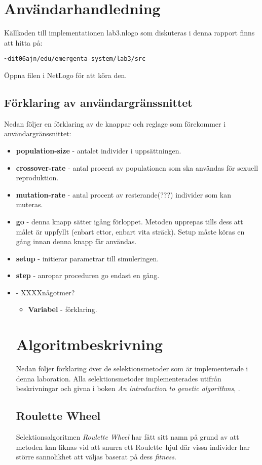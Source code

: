 \documentclass[titlepage, a4paper, 12pt]{article}
\begin{document}
\section{Användarhandledning}
Källkoden till implementationen lab3.nlogo som diskuteras i denna
rapport finns att hitta på:

\verb!~dit06ajn/edu/emergenta-system/lab3/src!

Öppna filen i NetLogo för att köra den.

\subsection{Förklaring av användargränssnittet}
Nedan följer en förklaring av de knappar och reglage som förekommer i
användargränssnittet:

\begin{itemize}
\item \textbf{population-size} - antalet individer i uppsättningen.
\item \textbf{crossover-rate} - antal procent av populationen som ska användas för sexuell reproduktion.
\item \textbf{mutation-rate} - antal procent av resterande(???) individer som kan muteras.
\item \textbf{go} - denna knapp sätter igång förloppet. Metoden upprepas tills dess att målet är uppfyllt (enbart ettor, enbart vita sträck). Setup måste köras en gång innan denna knapp får användas.
\item \textbf{setup} - initierar parametrar till simuleringen.
\item \textbf{step} - anropar proceduren go endast en gång.
\item \textbf{} - XXXXnågotmer?

\begin{itemize}
\item \textbf{Variabel} - förklaring.
\end{itemize}

\section{Algoritmbeskrivning}
Nedan följer förklaring över de selektionsmetoder som är
implementerade i denna laboration. Alla selektionsmetoder
implementerades utifrån beskrivningar och givna i boken \textit{An
  introduction to genetic algorithms}, \cite{gen-intro}.

\subsection{Roulette Wheel}\label{sec:roulette-wheel}
Selektionsalgoritmen \textit{Roulette Wheel} har fått sitt namn på
grund av att metoden kan liknas vid att snurra ett Roulette–hjul där
vissa individer har större sannolikhet att väljas baserat på dess
\textit{fitness}.


\end{itemize}
\end{document}
